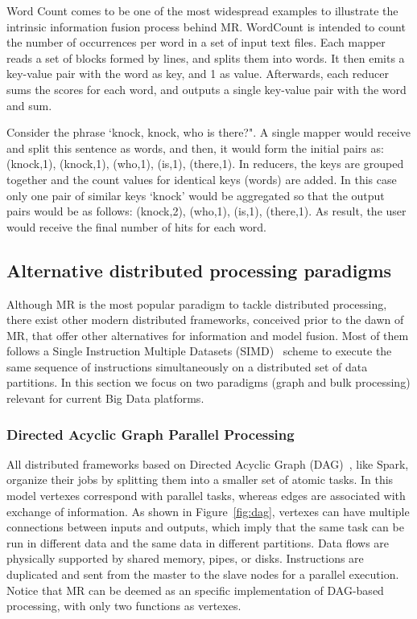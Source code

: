 \documentclass[3p,review]{elsarticle}
\begin{document}
	Word Count comes to be one of the most widespread examples to illustrate the intrinsic information fusion process behind MR. WordCount is intended to count the number of occurrences per word in a set of input text files. Each mapper reads a set of blocks formed by lines, and splits them into words. It then emits a key-value pair with the word as key, and 1 as value. Afterwards, each reducer sums the scores for each word, and outputs a single key-value pair with the word and sum. 
	
	Consider the phrase `knock, knock, who is there?". A single mapper would receive and split this sentence as words, and then, it would form the initial pairs as: (knock,1), (knock,1), (who,1), (is,1), (there,1). In reducers, the keys are grouped together and the count values for identical keys (words) are added. In this case only one pair of similar keys `knock' would be aggregated so that the output pairs would be as follows: (knock,2), (who,1), (is,1), (there,1). As result, the user would receive the final number of hits for each word. 
	
	
	
	\subsection{Alternative distributed processing paradigms}\label{subsec:altMR}
	
	Although MR is the most popular paradigm to tackle distributed processing, there exist other modern distributed frameworks, conceived prior to the dawn of MR, that offer other alternatives for information and model fusion. Most of them follows a Single Instruction Multiple Datasets (SIMD)~\cite{sung00} scheme to execute the same sequence of instructions simultaneously on a distributed set of data partitions. In this section we focus on two paradigms (graph and bulk processing) relevant for current Big Data platforms.
	
	\subsubsection{Directed Acyclic Graph Parallel Processing}
	
	All distributed frameworks based on Directed Acyclic Graph (DAG)~\cite{zaman13}, like Spark, organize their jobs by splitting them into a smaller set of atomic tasks. In this model vertexes correspond with parallel tasks, whereas edges are associated with exchange of information. As shown in Figure~\ref{fig:dag}, vertexes can have multiple connections between inputs and outputs, which imply that the same task can be run in different data and the same data in different partitions. Data flows are physically supported by shared memory, pipes, or disks. Instructions are duplicated and sent from the master to the slave nodes for a parallel execution. Notice that MR can be deemed as an specific implementation of DAG-based processing, with only two functions as vertexes. 
	
\end{document}
